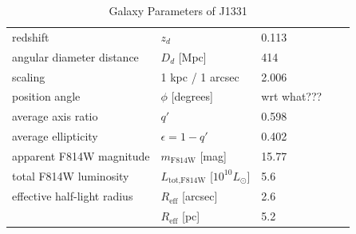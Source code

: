 \begin{table}
\centering
\begin{minipage}{140mm}
\caption{Galaxy Parameters of J1331}
\begin{tabular}{lllrl}
\hline
redshift                  & $z_d$ & 0.113 & \citep{SWELLSIII}\\
angular diameter distance & $D_d$ [Mpc] & 414 & \\
scaling                   & 1 kpc / 1 arcsec & 2.006 & \\
position angle            & $\phi$ [degrees] & wrt what???\\
average axis ratio & $q'$ & 0.598\\
average ellipticity & $\epsilon = 1 - q'$ & 0.402 & \\
apparent F814W magnitude & $m_\text{F814W}$ [mag] & 15.77 & \\
total F814W luminosity & $L_\text{tot,F814W}$ [$10^{10} L_\odot$] & 5.6 & \\
effective half-light radius & $R_\text{eff}$ [arcsec] & 2.6 & \\
& $R_\text{eff}$ [pc]& 5.2 & \\
\hline
\end{tabular}
\label{tab:galaxyparameters}
\end{minipage}
\end{table}
